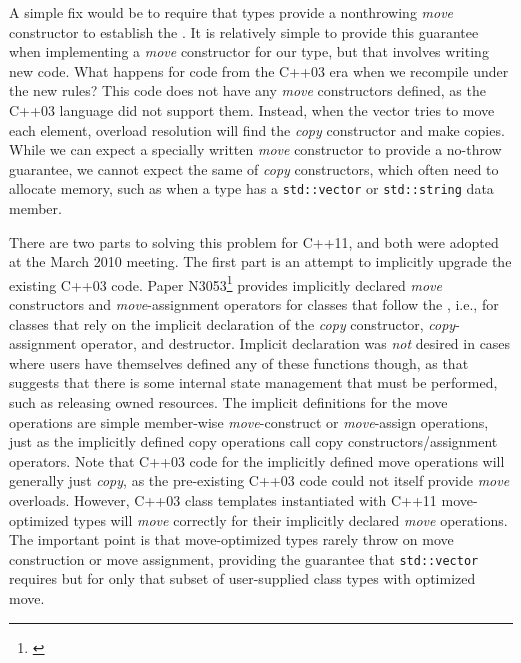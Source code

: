 A simple fix would be to require that types provide a nonthrowing
\emph{move} constructor to establish the . It is relatively simple to provide this guarantee when
implementing a \emph{move} constructor for our type, but that involves
writing new code. What happens for code from the C++03 era when we
recompile under the new rules? This code does not have any \emph{move}
constructors defined, as the C++03 language did not support them.
Instead, when the vector tries to move each element, overload resolution
will find the \emph{copy} constructor and make copies. While we can
expect a specially written \emph{move} constructor to provide a no-throw
guarantee, we cannot expect the same of \emph{copy} constructors, which
often need to allocate memory, such as when a type has a
\lstinline!std::vector! or \lstinline!std::string! data member.

There are two parts to solving this problem for C++11, and both were
adopted at the March 2010 meeting. The first part is an attempt to
implicitly upgrade the existing C++03 code. Paper N3053\footnote{\cite{stroustrup10}} provides implicitly declared \emph{move} constructors and
\emph{move}-assignment operators for classes that follow the
, i.e., for classes that rely on the implicit
declaration of the \emph{copy} constructor, \emph{copy}-assignment
operator, and destructor. Implicit declaration was \emph{not} desired in
cases where users have themselves defined any of these functions though,
as that suggests that there is some internal state management that must
be performed, such as releasing owned resources. The implicit
definitions for the move operations are simple member-wise
\emph{move}-construct or \emph{move}-assign operations, just as the
implicitly defined copy operations call copy constructors/assignment
operators. Note that C++03 code for the implicitly defined move
operations will generally just \emph{copy}, as the pre-existing C++03
code could not itself provide \emph{move} overloads. However, C++03
class templates instantiated with C++11 move-optimized types will
\emph{move} correctly for their implicitly declared \emph{move}
operations. The important point is that move-optimized types rarely
throw on move construction or move assignment, providing the guarantee
that \lstinline!std::vector! requires but for only that subset of
user-supplied class types with optimized move.

